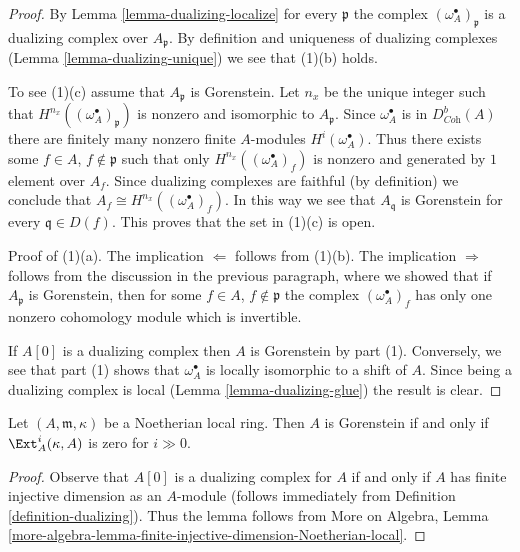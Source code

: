 \begin{proof}
By Lemma \ref{lemma-dualizing-localize} for every
$\mathfrak p$ the complex $(\omega_A^\bullet)_\mathfrak p$ is a
dualizing complex over $A_\mathfrak p$. By definition and uniqueness
of dualizing complexes (Lemma \ref{lemma-dualizing-unique})
we see that (1)(b) holds.

\medskip\noindent
To see (1)(c) assume that $A_\mathfrak p$ is Gorenstein.
Let $n_x$ be the unique integer such that
$H^{n_{x}}((\omega_A^\bullet)_\mathfrak p)$
is nonzero and isomorphic to $A_\mathfrak p$.
Since $\omega_A^\bullet$ is in $D^b_{\textit{Coh}}(A)$
there are finitely many nonzero finite $A$-modules
$H^i(\omega_A^\bullet)$. Thus there exists some
$f \in A$, $f \not \in \mathfrak p$
such that only $H^{n_x}((\omega_A^\bullet)_f)$
is nonzero and generated by $1$ element over $A_f$.
Since dualizing complexes are faithful (by definition)
we conclude that $A_f \cong H^{n_x}((\omega_A^\bullet)_f)$.
In this way we see that $A_\mathfrak q$ is Gorenstein
for every $\mathfrak q \in D(f)$. This proves that the set
in (1)(c) is open.

\medskip\noindent
Proof of (1)(a). The implication $\Leftarrow$ follows from (1)(b).
The implication $\Rightarrow$ follows from the discussion
in the previous paragraph, where we showed that if $A_\mathfrak p$
is Gorenstein, then for some $f \in A$, $f \not \in \mathfrak p$
the complex $(\omega_A^\bullet)_f$ has only one nonzero cohomology module
which is invertible.

\medskip\noindent
If $A[0]$ is a dualizing complex then $A$ is Gorenstein by
part (1). Conversely, we see that part (1) shows that
$\omega_A^\bullet$ is locally isomorphic to a shift of $A$.
Since being a dualizing complex is local
(Lemma \ref{lemma-dualizing-glue})
the result is clear.
\end{proof}

\begin{lemma}
\label{lemma-gorenstein-ext}
Let $(A, \mathfrak m, \kappa)$ be a Noetherian local ring.
Then $A$ is Gorenstein if and only if $\Ext^i_A(\kappa, A)$
is zero for $i \gg 0$.
\end{lemma}

\begin{proof}
Observe that $A[0]$ is a dualizing complex for $A$ if and only
if $A$ has finite injective dimension as an $A$-module
(follows immediately from Definition \ref{definition-dualizing}).
Thus the lemma follows from More on Algebra, Lemma
\ref{more-algebra-lemma-finite-injective-dimension-Noetherian-local}.
\end{proof}

